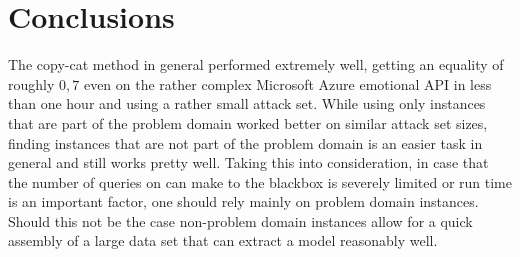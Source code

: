 \documentclass[a4paper,11pt]{article}
\begin{document}
\section{Conclusions}
    The copy-cat method in general performed extremely well, getting an equality of roughly $0,7$ even on the rather complex Microsoft Azure emotional API in less than one hour and using a rather small attack set. While using only instances that are part of the problem domain worked better on similar attack set sizes, finding instances that are not part of the problem domain is an easier task in general and still works pretty well. Taking this into consideration, in case that the number of queries on can make to the blackbox is severely limited or run time is an important factor, one should rely mainly on problem domain instances. Should this not be the case non-problem domain instances allow for a quick assembly of a large data set that can extract a model reasonably well.




\end{document}
